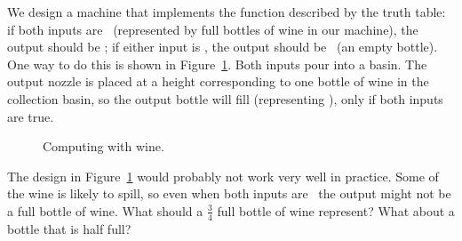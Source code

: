 \begin{schemeregion}
We design a machine that implements the function described by the truth table: if both inputs are \true\ (represented by full bottles of wine in our machine), the output should be \true; if either input is \false, the output should be \false\ (an empty bottle).  One way to do this is shown in Figure~\ref{fig:wine-and-gate}.  Both inputs pour into a basin.  The output nozzle is placed at a height corresponding to one bottle of wine in the collection basin, so the output bottle will fill (representing \true), only if both inputs are true.

\begin{figure}[!htbp] 
\begin{center}
{} 
\end{center}
\caption{Computing  with wine.\label{fig:wine-and-gate}}
\end{figure}

The design in Figure~\ref{fig:wine-and-gate} would probably not work very well in practice.  Some of the wine is likely to spill, so even when both inputs are \true\ the output might not be a full bottle of wine.  What should a $\frac{3}{4}$ full bottle of wine represent?  What about a bottle that is half full?


\end{schemeregion}

